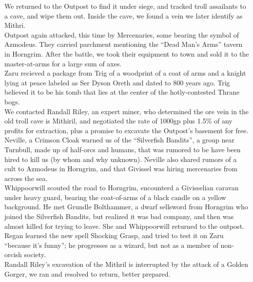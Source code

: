 \documentclass[letterpaper]{article}
\begin{document}
\noindent We returned to the Outpost to find it under siege, and tracked troll assailants to a cave, and wipe them out. Inside the cave, we found a vein we later identify as Mithri.\\

\noindent Outpost again attacked, this time by Mercenaries, some bearing the symbol of Azmodeus.  They carried parchment mentioning the ``Dead Man's Arms'' tavern in Horngrim.  After the battle, we took their equipment to town and sold it to the master-at-arms for a large sum of axes.\\

\noindent Zaru recieved a package from Trig of a woodprint of a coat of arms and a knight lying at peace labeled as Ser Dyson Oreth and dated to 800 years ago.  Trig believed it to be his tomb that lies at the center of the hotly-contested Thrane bogs.\\

\noindent We contacted Randall Riley, an expert miner, who determined the ore vein in the old troll cave is Mithiril, and negotiated the rate of 1000gp plus 1.5\% of any profits for extraction, plus a promise to excavate the Outpost's basement for free.\\

\noindent Neville, a Crimson Cloak warned us of the ``Silverfish Bandits'', a group near Turnbull, made up of half-orcs and humans, that was rumored to be have been hired to kill us (by whom and why unknown). Neville also shared rumors of a cult to Azmodeus in Horngrim, and that Givissel was hiring mercenaries from across the sea.\\

\noindent Whippoorwill scouted the road to Horngrim, encounterd a Givisselian caravan under heavy guard, bearing the coat-of-arms of a black candle on a yellow background.  He met Grundle Bolthammer, a dwarf sellsword from Horngrim who joined the Silverfish Bandits, but realized it was bad company, and then was almost killed for trying to leave. She and Whippoorwill returned to the outpost.\\

\noindent Regan learned the new spell Shocking Grasp, and tried to test it on Zaru ``because it's funny''; he progresses as a wizard, but not as a member of non-orcish society.\\

\noindent Randall Riley's excavation of the Mithril is interrupted by the attack of a Golden Gorger, we ran and resolved to return, better prepared.\\
\end{document}
